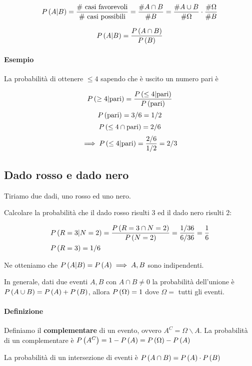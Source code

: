 \[ P\left(A|B\right) = \dfrac{\text{\# casi favorevoli}}{\text{\# casi possibili}} = \dfrac{\# A \cap B}{\# B} = \dfrac{\# A \cup B}{\# \Omega} \cdot \dfrac{\# \Omega}{\# B}\]

\[ P\left(A|B\right) = \dfrac{P\left(A \cap B\right)}{P\left(B\right)} \]

\paragraph{Esempio}
La probabilità di ottenere $ \leq 4 $ sapendo che è uscito un numero pari è

\[ P\left(\geq 4|\text{pari}\right) = \dfrac{P\left(\leq 4 | \text{pari}\right)}{P\left(\text{pari}\right)} \]
\[ P\left(\text{pari}\right) = 3/6 = 1/2 \]
\[ P\left(\leq 4 \cap \text{pari}\right) = 2/6 \]
\[ \implies P\left(\leq 4|\text{pari}\right) = \dfrac{2/6}{1/2} = 2/3 \]  
\subsection{Dado rosso e dado nero}

Tiriamo due dadi, uno rosso ed uno nero.

Calcolare la probabilità che il dado rosso risulti 3 ed il dado nero risulti 2:

\begin{align*}
	& P\left(R=3 | N=2\right) = \dfrac{P\left(R=3 \cap N=2\right)}{P\left(N=2\right)} = \dfrac{1/36}{6/36} = \dfrac{1}{6} \\
	& P\left(R=3\right) = 1/6
\end{align*}

Ne otteniamo che $ P\left(A|B\right) = P\left(A\right) \implies A, B $ sono indipendenti.

In generale, dati due eventi $ A, B $ con $ A \cap B \neq 0 $ la probabilità dell'unione è $ P\left(A \cup B\right) = P\left(A\right) + P\left(B\right) $, allora $ P\left(\Omega\right) = 1 $ dove $ \Omega = $ tutti gli eventi.

\paragraph{Definizione} Definiamo il \textbf{complementare} di un evento, ovvero $ A^C=\Omega \backslash A $. La probabilità di un complementare è $ P\left(A^C\right) = 1 - P\left(A\right) = P\left(\Omega\right) - P\left(A\right) $

La probabilità di un intersezione di eventi è $ P\left(A \cap B\right) = P\left(A\right) \cdot P\left(B\right) $

\clearpage
